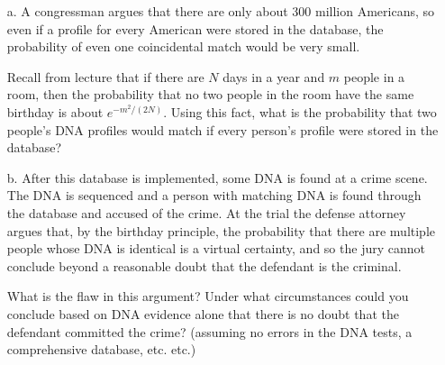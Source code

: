 \documentclass[12pt]{article}
\begin{document}
\begin{itemize}
\item[a.] A congressman argues that there are only about 300 million
Americans, so even if a profile for every American were stored in the
database, the probability of even one coincidental match would be very
small. 

Recall from lecture that if there are $N$ days in a year and $m$ people in a room, then the probability that no two people in the room have the same birthday is about $e^{-m^2/(2N)}$.  Using this fact, what is the probability that two people's DNA profiles would match if every person's profile were stored in the database?




\item[b.] After this database is implemented, some DNA is found at a crime scene. The DNA is sequenced and a person with matching DNA is found through the database and accused of the crime.  At the trial the defense attorney argues that, by the birthday principle, the probability that there are multiple people whose DNA is identical is a virtual certainty, and so the jury cannot conclude beyond a reasonable doubt that the defendant is the criminal.  

What is the flaw in this argument? Under what circumstances could you conclude based on DNA evidence alone that there is no doubt that the defendant committed the crime? (assuming  no errors in the DNA tests, a comprehensive database, etc. etc.)

\end{itemize}
\end{document}
